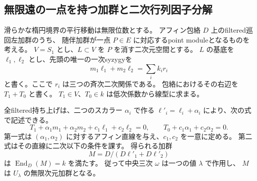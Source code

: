 \subsection{無限遠の一点を持つ加群と二次行列因子分解}
\label{subsec:cubic-CY-three-alpha-elliptic-line-modules}

\begin{theorem}\label{thm:cubic-CY-three-alpha-elliptic-filtered-line-modules}
滑らかな楕円境界の平行移動は無限位数とする。
アフィン包絡 $D$ 上のfiltered巡回左加群のうち、
随伴加群が一点 $P\in E$ に対応するpoint moduleとなるものを考える。
$V=S_1$ とし、$L\subset V$ を $P$ を消す二次元空間とする。
$L$ の基底を $\ell_1,\ell_2$ とし、先頭の唯一の一次syzygyを
\[
 m_1\ell_1+m_2\ell_2=\sum_i k_i r_i
\]
と書く。ここで $r_i$ は三つの斉次二次関係である。
包絡におけるその右辺を $T_1+T_0$ と書く。
$T_1\in V$、$T_0\in k$ は低次係数から線型に求まる。

全filtered持ち上げは、二つのスカラー $\alpha_i$ で作る
$\ell'_i=\ell_i+\alpha_i$ により、次の式で記述できる。
\[
 T_1+\alpha_1m_1+\alpha_2m_2+c_1\ell_1+c_2\ell_2=0,
 \qquad T_0+c_1\alpha_1+c_2\alpha_2=0 .
\]
第一式は $(\alpha_1,\alpha_2)$ に対するアフィン直線を与え、$c_1,c_2$ を一意に定める。
第二式はその直線に二次以下の条件を課す。
得られる加群
\[
 M=D/(D\ell'_1+D\ell'_2)
\]
は $\operatorname{End}_D(M)=k$ を満たす。
従って中央三次 $\omega$ は一つの値 $\lambda$ で作用し、
$M$ は $U_\lambda$ の無限次元加群となる。
\end{theorem}
